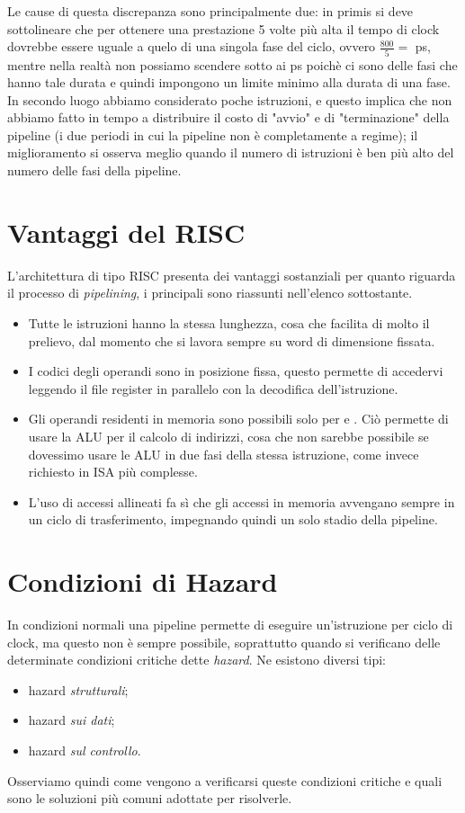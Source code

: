 \documentclass[class=book, crop=false, oneside]{standalone}
\begin{document}
Le cause di questa discrepanza sono principalmente due: in primis si deve sottolineare che per ottenere una prestazione 5 volte più alta il tempo di clock dovrebbe essere uguale a quelo di una singola fase del ciclo, ovvero \(\frac{800}{5}=\) \unit[160]{ps}, mentre nella realtà non possiamo scendere sotto ai \unit[200]{ps} poichè ci sono delle fasi che hanno tale durata e quindi impongono un limite minimo alla durata di una fase. In secondo luogo abbiamo considerato poche istruzioni, e questo implica che non abbiamo fatto in tempo a distribuire il costo di "avvio" e di "terminazione" della pipeline (i due periodi in cui la pipeline non è completamente a regime); il miglioramento si osserva meglio quando il numero di istruzioni è ben più alto del numero delle fasi della pipeline.

\section{Vantaggi del RISC}
L'architettura di tipo RISC presenta dei vantaggi sostanziali per quanto riguarda il processo di \emph{pipelining}, i principali sono riassunti nell'elenco sottostante.
\begin{itemize}
	\item Tutte le istruzioni hanno la stessa lunghezza, cosa che facilita di molto il prelievo, dal momento che si lavora sempre su word di dimensione fissata.
	\item I codici degli operandi sono in posizione fissa, questo permette di accedervi leggendo il file register in parallelo con la decodifica dell’istruzione.
	\item Gli operandi residenti in memoria sono possibili solo per  e . Ciò permette di usare la ALU per il calcolo di indirizzi, cosa che non sarebbe possibile se dovessimo usare le ALU in due fasi della stessa istruzione, come invece richiesto in ISA più complesse.
	\item  L’uso di accessi allineati fa sì che gli accessi in memoria avvengano sempre in un ciclo di trasferimento, impegnando quindi un solo stadio della pipeline.
\end{itemize}

\section{Condizioni di Hazard}
In condizioni normali una pipeline permette di eseguire un'istruzione per ciclo di clock, ma questo non è sempre possibile, soprattutto quando si verificano delle determinate condizioni critiche dette \emph{hazard}. Ne esistono diversi tipi:
\begin{itemize}
	\item hazard \emph{strutturali};
	\item hazard \emph{sui dati};
	\item hazard \emph{sul controllo}.
\end{itemize}
Osserviamo quindi come vengono a verificarsi queste condizioni critiche e quali sono le soluzioni più comuni adottate per risolverle.
\end{document}
